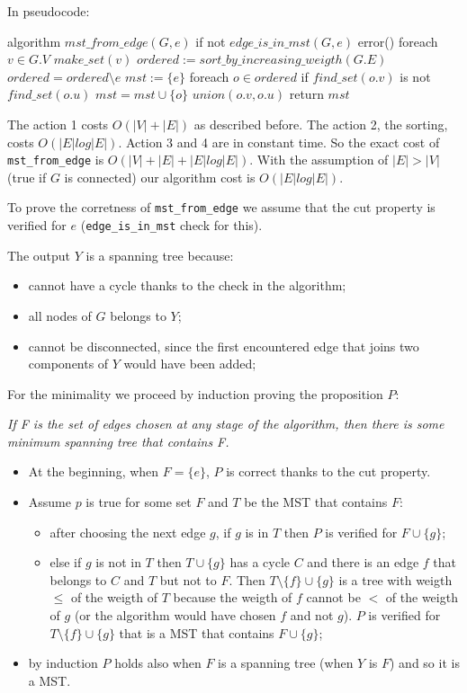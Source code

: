 \documentclass[paper=a4, fontsize=11pt]{scrartcl} %
\numberwithin{equation}{section} %
\numberwithin{figure}{section} %
\numberwithin{table}{section} %
\begin{document}
In pseudocode:

\begin{pseudo}
algorithm $mst\_from\_edge(G, e)$
    if not $edge\_is\_in\_mst(G, e)$
        error()
    foreach $v \in G.V$
        $make\_set(v)$
    $ordered := sort\_by\_increasing\_weigth(G.E)$
    $ordered = ordered \setminus e$
    $mst := \{e\}$
    foreach $o \in ordered$
        if $find\_set(o.v)$ is not $find\_set(o.u)$
            $mst = mst \cup \{o\}$
            $union(o.v, o.u)$
    return $mst$
\end{pseudo}

The action 1 costs $O(|V|+|E|)$ as described before.
The action 2, the sorting, costs $O(|E|log|E|)$.
Action 3 and 4 are in constant time.
So the exact cost of \verb|mst_from_edge| is $O(|V|+|E| + |E|log|E|)$.
With the assumption of $|E| > |V|$ (true if $G$ is connected)  our algorithm cost is $O(|E|log|E|)$.

To prove the corretness of \verb|mst_from_edge| we assume that the cut property is verified for $e$ (\verb|edge_is_in_mst| check for this).

The output $Y$ is a spanning tree because:
\begin{itemize}
    \item cannot have a cycle thanks to the check in the algorithm;
    \item all nodes of $G$ belongs to $Y$;
    \item cannot be disconnected, since the first encountered edge that joins two components of $Y$ would have been added;
\end{itemize}

For the minimality we proceed by induction proving the proposition $P$:

\bigskip
{\em If F is the set of edges chosen at any stage of the algorithm, then there is some minimum spanning tree that contains F.}
\bigskip

\begin{itemize}
    \item At the beginning, when $F = \{e\}$, $P$ is correct thanks to the cut property.
    \item Assume $p$ is true for some set $F$ and $T$ be the MST that contains $F$:
    \begin{itemize}
        \item after choosing the next edge $g$, if $g$ is in $T$ then $P$ is verified for $F \cup \{g\}$;
        \item else if $g$ is not in $T$ then $T \cup \{g\}$ has a cycle $C$ and there is an edge $f$ that belongs to $C$ and $T$ but not to $F$. Then $T \setminus \{f\} \cup \{g\}$ is a tree with weigth $\leq$ of the weigth of $T$ because the weigth of $f$ cannot be $<$ of the weigth of $g$ (or the algorithm would have chosen $f$ and not $g$). $P$ is verified for $T \setminus \{f\} \cup \{g\}$ that is a MST that contains $F \cup \{g\}$; 
    \end{itemize}
    \item by induction $P$ holds also when $F$ is a spanning tree (when $Y$ is $F$) and so it is a MST.
\end{itemize}
\end{document}
